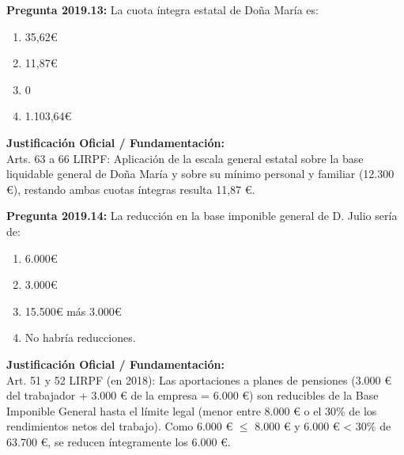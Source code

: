 \documentclass[11pt,a4paper,openany]{article}
\begin{document}
\noindent\textbf{\sffamily Pregunta 2019.13:} La cuota íntegra estatal de Doña María es:\\[0.15cm]
\begin{enumerate}[label=\textbf{\alph*)},leftmargin=1.8em,itemsep=1.5pt,topsep=2pt,partopsep=0pt,parsep=0pt]
    \item 35,62\euro{}
    \item 11,87\euro{}
    \item 0
    \item 1.103,64\euro{}
\end{enumerate}
\begin{solucionBox}
\textbf{Justificación Oficial / Fundamentación:}\\[0.1cm]
Arts. 63 a 66 LIRPF: Aplicación de la escala general estatal sobre la base liquidable general de Doña María y sobre su mínimo personal y familiar (12.300 \euro{}), restando ambas cuotas íntegras resulta 11,87 \euro{}.
\end{solucionBox}
\vspace{0.35cm}

\noindent\textbf{\sffamily Pregunta 2019.14:} La reducción en la base imponible general de D. Julio sería de:\\[0.15cm]
\begin{enumerate}[label=\textbf{\alph*)},leftmargin=1.8em,itemsep=1.5pt,topsep=2pt,partopsep=0pt,parsep=0pt]
    \item 6.000\euro{}
    \item 3.000\euro{}
    \item 15.500\euro{} más 3.000\euro{}
    \item No habría reducciones.
\end{enumerate}
\begin{solucionBox}
\textbf{Justificación Oficial / Fundamentación:}\\[0.1cm]
Art. 51 y 52 LIRPF (en 2018): Las aportaciones a planes de pensiones (3.000 \euro{} del trabajador + 3.000 \euro{} de la empresa = 6.000 \euro{}) son reducibles de la Base Imponible General hasta el límite legal (menor entre 8.000 \euro{} o el 30\% de los rendimientos netos del trabajo). Como 6.000 \euro{} $\le$  8.000 \euro{} y 6.000 \euro{} < 30\% de 63.700 \euro{}, se reducen íntegramente los 6.000 \euro{}.
\end{solucionBox}
\vspace{0.35cm}
\end{document}
